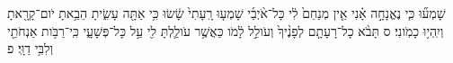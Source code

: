 \documentclass{openreader}
\begin{document}
שָׁמְע֞וּ כִּ֧י נֶאֱנָחָ֣ה אָ֗נִי אֵ֤ין מְנַחֵם֙ לִ֔י כָּל־אֹ֨יְבַ֜י שָׁמְע֤וּ רָֽעָתִי֙ שָׂ֔שׂוּ כִּ֥י אַתָּ֖ה עָשִׂ֑יתָ הֵבֵ֥אתָ יֹום־קָרָ֖אתָ וְיִֽהְי֥וּ כָמֹֽונִי׃ ס 
תָּבֹ֨א כָל־רָעָתָ֤ם לְפָנֶ֨יךָ֙ וְעֹולֵ֣ל לָ֔מֹו כַּאֲשֶׁ֥ר עֹולַ֛לְתָּ לִ֖י עַ֣ל כָּל־פְּשָׁעָ֑י כִּֽי־רַבֹּ֥ות אַנְחֹתַ֖י וְלִבִּ֥י דַוָּֽי׃ פ 
\end{document}
